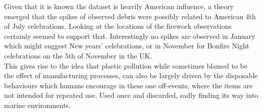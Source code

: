 \documentclass[10pt]{article}\usepackage[]{graphicx}\usepackage[]{color}
\begin{document}
Given that it is known the dataset is heavily American influence, a theory emerged that the spikes of observed debris were possibly related to American 4th of July celebrations. Looking at the locations of the firework observations certainly seemed to support that. Interestingly no spikes are observed in January which might suggest New years' celebrations, or in November for Bonfire Night celebrations on the 5th of November in the UK.\\

This gives rise to the idea that plastic pollution while sometimes blamed to be the effect of manufacturing processes, can also be largely driven by the disposable behaviours which humans encourage in these one off-events, where the items are not intended for repeated use. Used once and discarded, sadly finding its way into marine environments.
\end{document}
